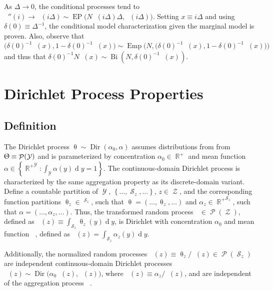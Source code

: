 \documentclass[12pt]{report}
\DeclareMathOperator{\drm}{\mathrm{d}}
\DeclareMathOperator{\Ycal}{\mathcal{Y}}
\DeclareMathOperator{\Zcal}{\mathcal{Z}}
\DeclareMathOperator{\Scal}{\mathcal{S}}
\DeclareMathOperator{\Pcal}{\mathcal{P}}
\DeclareMathOperator{\Rbb}{\mathbb{R}}
\DeclareMathOperator{\Rbbgeq}{\mathbb{R}_{\geq 0}}
\DeclareMathOperator{\Dir}{\mathrm{Dir}}
\DeclareMathOperator{\Bi}{\mathrm{Bi}}
\DeclareMathOperator{\Emp}{\mathrm{Emp}}
\DeclareMathOperator{\EP}{\mathrm{EP}}
\DeclareMathOperator{\thetam}{\theta_\text{m}}
\DeclareMathOperator{\upthetam}{\uptheta_\text{m}}
\DeclareMathOperator{\upthetac}{\uptheta_\text{c}}
\DeclareMathOperator{\uppsim}{\uppsi_\text{m}}
\DeclareMathOperator{\uppsic}{\uppsi_\text{c}}
\DeclareMathOperator{\alpham}{\alpha_\text{m}}
\DeclareMathOperator{\alphac}{\alpha_\text{c}}
\begin{document}
As $\Delta \to 0$, the conditional processes tend to $\uppsic''(i) \to \uppsic(i \Delta) \sim \EP\big( N \uppsim(i \Delta) \Delta, \uppsic(i \Delta) \big)$. Setting $x \equiv i\Delta$ and using $\delta(0) \equiv \Delta^{-1}$, the conditional model characterization given the marginal model is proven. Also, observe that $\big( \delta(0)^{-1} \uppsim(x),1 - \delta(0)^{-1} \uppsim(x)\big) \sim \Emp\Big( N, \big( \delta(0)^{-1} \thetam(x), 1 - \delta(0)^{-1} \thetam(x)\big) \Big)$ and thus that $\delta(0)^{-1} N \uppsim(x) \sim \Bi\left(N, \delta(0)^{-1} \thetam(x) \right)$.
 





\section{Dirichlet Process Properties} \label{app:DP}


\subsection{Definition}

The Dirichlet process $\uptheta \sim \Dir(\alpha_0,\alpha)$ assumes distributions from from $\Uptheta \equiv \Pcal(\Ycal)$ and is parameterized by concentration $\alpha_0 \in \Rbb^+$ and mean function $\alpha \in \left\{ {\Rbb^+}^{\Ycal} : \int_{\Ycal} \alpha(y) {\drm}y = 1 \right\}$. The continuous-domain Dirichlet process is characterized by the same aggregation property as its discrete-domain variant. Define a countable partition of $\Ycal$, $\left\{ \ldots,\Scal_z,\ldots \right\}$, $z \in \Zcal$, and the corresponding function partitions $\uptheta_z \in \Rbbgeq^{\Scal_z}$, such that $\uptheta = \left( \ldots,\uptheta_z,\ldots \right)$ and $\alpha_z \in {\Rbb^+}^{\Scal_z}$, such that $\alpha = \left( \ldots,\alpha_z,\ldots \right)$. Thus, the transformed random process $\upthetam \in \Pcal(\Zcal)$, defined as $\upthetam(z) \equiv \int_{\Scal_z} \uptheta_z(y) {\drm}y$, is Dirichlet with concentration $\alpha_0$ and mean function $\alpham$, defined as $\alpham(z) = \int_{\Scal_z} \alpha_z(y) {\drm}y$.

Additionally, the normalized random processes $\upthetac(z) \equiv \uptheta_z / \upthetam(z) \in \Pcal(\Scal_z)$ are independent continuous-domain Dirichlet processes $\upthetac(z) \sim \Dir\big(\alpha_0 \alpham(z), \alphac(z)\big)$, where $\alphac(z) \equiv \alpha_z / \alpham(z)$, and are independent of the aggregation process $\upthetam$.
\end{document}

